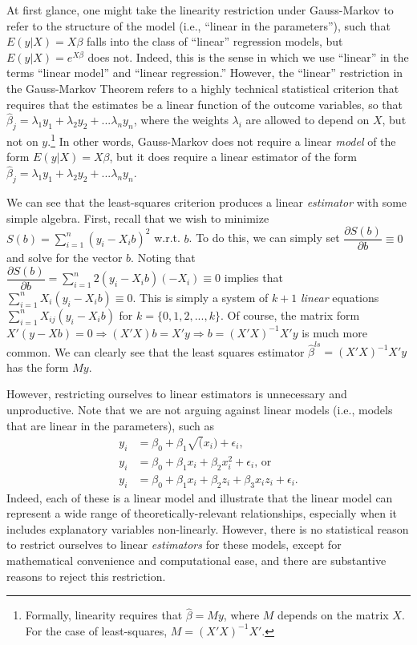 \documentclass[12pt]{article}
\begin{document}
At first glance, one might take the linearity restriction under Gauss-Markov to refer to the structure of the model (i.e., ``linear in the parameters''), such that $E(y | X) = X\beta$ falls into the class of ``linear'' regression models, but  $E(y | X) = e^{X\beta}$ does not. Indeed, this is the sense in which we use ``linear'' in the terms ``linear model'' and ``linear regression.'' However, the ``linear'' restriction in the Gauss-Markov Theorem refers to a highly technical statistical criterion that requires that the estimates be a linear function of the outcome variables, so that $\hat{\beta}_j = \lambda_1 y_1 + \lambda_2 y_2 + ... \lambda_n y_n$, where the weights $\lambda_i$ are allowed to depend on $X$, but not on $y$.\footnote{Formally, linearity requires that $\hat{\beta} = My$, where $M$ depends on the matrix $X$. For the case of least-squares, $M = (X'X)^{-1}X'$.} In other words, Gauss-Markov does not require a linear \textit{model} of the form $E(y | X) = X\beta$, but it does require a linear estimator of the form $\hat{\beta}_j = \lambda_1 y_1 + \lambda_2 y_2 + ... \lambda_n y_n$. 

We can see that the least-squares criterion produces a linear \textit{estimator} with some simple algebra. First, recall that we wish to minimize $S(b) = \sum_{i = 1}^n(y_i - X_ib)^2$ w.r.t. $b$. To do this, we can simply set $\dfrac{\partial S(b)}{\partial b} \equiv 0$ and solve for the vector $b$. Noting that $\dfrac{\partial S(b)}{\partial b} = \sum_{i = 1}^n 2(y_i - X_ib)(-X_i) \equiv 0$ implies that $\sum_{i = 1}^n X_i(y_i - X_ib) \equiv 0$. This is simply a system of $k+1$ \textit{linear} equations $\sum_{i = 1}^n X_{ij}(y_i - X_ib)$ for $k = \{0, 1, 2,..., k\}$. Of course, the matrix form $X'(y - Xb) = 0 \Rightarrow (X'X)b = X'y \Rightarrow b = (X'X)^{-1}X'y$ is much more common. We can clearly see that the least squares estimator $\hat{\beta}^{ls} = (X'X)^{-1}X'y$ has the form $My$.

However, restricting ourselves to linear estimators is unnecessary and unproductive. Note that we are not arguing against linear models (i.e., models that are linear in the parameters), such as 
\begin{align*}
y_i &= \beta_0 + \beta_1\sqrt(x_i) + \epsilon_i\text{,}\\
y_i &= \beta_0 + \beta_1x_i + \beta_2x_i^2 + \epsilon_i\text{, or}\\ 
y_i &= \beta_0 + \beta_1x_i + \beta_2z_i + \beta_3x_iz_i + \epsilon_i\textit{.}
\end{align*}
Indeed, each of these is a linear model and illustrate that the linear model can represent a wide range of theoretically-relevant relationships, especially when it includes explanatory variables non-linearly. However, there is no statistical reason to restrict ourselves to linear \textit{estimators} for these models, except for mathematical convenience and computational ease, and there are substantive reasons to reject this restriction.
\end{document}
